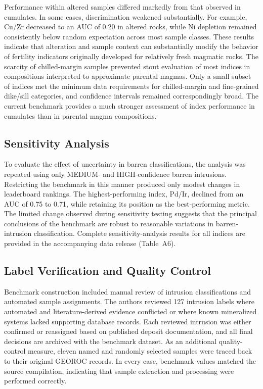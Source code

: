 \documentclass[10pt,twocolumn,letterpaper]{article}
\begin{document}
Performance within altered samples differed markedly from that observed in cumulates. In some cases, discrimination weakened substantially. For example, Cu/Zr decreased to an AUC of 0.20 in altered rocks, while Ni depletion remained consistently below random expectation across most sample classes. These results indicate that alteration and sample context can substantially modify the behavior of fertility indicators originally developed for relatively fresh magmatic rocks. The scarcity of chilled-margin samples prevented stout evaluation of most indices in compositions interpreted to approximate parental magmas. Only a small subset of indices met the minimum data requirements for chilled-margin and fine-grained dike/sill categories, and confidence intervals remained correspondingly broad. The current benchmark provides a much stronger assessment of index performance in cumulates than in parental magma compositions.

\subsection{Sensitivity Analysis}
To evaluate the effect of uncertainty in barren classifications, the analysis was repeated using only MEDIUM- and HIGH-confidence barren intrusions. Restricting the benchmark in this manner produced only modest changes in leaderboard rankings. The highest-performing index, Pd/Ir, declined from an AUC of 0.75 to 0.71, while retaining its position as the best-performing metric. The limited change observed during sensitivity testing suggests that the principal conclusions of the benchmark are robust to reasonable variations in barren-intrusion classification. Complete sensitivity-analysis results for all indices are provided in the accompanying data release (Table~A6).

\subsection{Label Verification and Quality Control}
Benchmark construction included manual review of intrusion classifications and automated sample assignments. The authors reviewed 127 intrusion labels where automated and literature-derived evidence conflicted or where known mineralized systems lacked supporting database records. Each reviewed intrusion was either confirmed or reassigned based on published deposit documentation, and all final decisions are archived with the benchmark dataset. As an additional quality-control measure, eleven named and randomly selected samples were traced back to their original GEOROC records. In every case, benchmark values matched the source compilation, indicating that sample extraction and processing were performed correctly.
\end{document}
